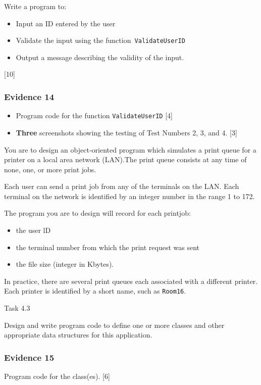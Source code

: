 Write a program to:
\begin{itemize}
\item Input an ID entered by the user 
\item Validate the input using the function\texttt{ ValidateUserID }
\item Output a message describing the validity of the input. 
\end{itemize}
\hfill{}{[}10{]}

\subsubsection*{Evidence 14}
\begin{itemize}
\item Program code for the function \texttt{ValidateUserID} \hfill{}{[}4{]}
\item \textbf{Three} screenshots showing the testing of Test Numbers 2,
3, and 4. \hfill{}{[}3{]}
\end{itemize}
You are to design an object-oriented program which simulates a print
queue for a printer on a local area network (LAN).The print queue
consists at any time of none, one, or more print jobs. 

Each user can send a print job from any of the terminals on the LAN.
Each terminal on the network is identified by an integer number in
the range 1 to 172. 

The program you are to design will record for each printjob: 
\begin{itemize}
\item the user lD
\item the terminal number from which the print request was sent
\item the file size (integer in Kbytes).
\end{itemize}
In practice, there are several print queues each associated with a
different printer. Each printer is identified by a short name, such
as \texttt{Room16}. 

Task 4.3

Design and write program code to define one or more classes and other
appropriate data structures for this application. 

\subsubsection*{Evidence 15}

Program code for the class(es). \hfill{}{[}6{]} 


